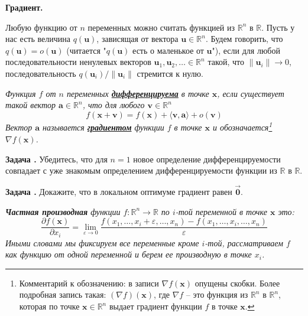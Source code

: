 \documentclass[12pt,a4paper]{article}
\def\R{\mathbb{R}}
\newcounter{znum}
\newcommand{\zz}[1]{\addtocounter{znum}{1} \textbf{Задача \arabic{znum}#1. }}
\begin{document}
\pagestyle{empty}

\begin{center} \Large \textbf{Градиент.}
\end{center}

Любую функцию от $n$ переменных можно считать функцией из $\R^n$ в $\R$. 
Пусть у нас есть величина $q(\mathbf{u})$, зависящая от вектора $\mathbf{u} \in \R^n$. Будем говорить, что $q(\mathbf{u}) = o(\mathbf{u})$ (читается "$q(\mathbf{u})$ есть о маленькое от $\mathbf{u}$"), если для любой последовательности ненулевых векторов $\mathbf{u}_1, \mathbf{u}_2, \ldots \in \R^n$ такой, что $\|\mathbf{u}_i\| \to 0$, последовательность $q(\mathbf{u}_i) / \| \mathbf{u}_i\|$ стремится к нулю.


{\it Функция $f$ от $n$ переменных \textbf{\href{https://ru.wikipedia.org/wiki/\%D0\%94\%D0\%B8\%D1\%84\%D1\%84\%D0\%B5\%D1\%80\%D0\%B5\%D0\%BD\%D1\%86\%D0\%B8\%D1\%80\%D1\%83\%D0\%B5\%D0\%BC\%D0\%B0\%D1\%8F_\%D1\%84\%D1\%83\%D0\%BD\%D0\%BA\%D1\%86\%D0\%B8\%D1\%8F\#\%D0\%A4\%D1\%83\%D0\%BD\%D0\%BA\%D1\%86\%D0\%B8\%D0\%B8_\%D0\%BD\%D0\%B5\%D1\%81\%D0\%BA\%D0\%BE\%D0\%BB\%D1\%8C\%D0\%BA\%D0\%B8\%D1\%85_\%D0\%BF\%D0\%B5\%D1\%80\%D0\%B5\%D0\%BC\%D0\%B5\%D0\%BD\%D0\%BD\%D1\%8B\%D1\%85}{дифференцируема}} в точке $\mathbf{x}$, если существует такой вектор $\mathbf{a} \in \R^n$, что для любого $\mathbf{v} \in \R^n$
$$ f(\mathbf{x} + \mathbf{v}) = f(\mathbf{x}) + \langle \mathbf{v}, \mathbf{a} \rangle + o(\mathbf{v})$$
Вектор $\mathbf{a}$ называется \textbf{\href{https://ru.wikipedia.org/wiki/\%D0\%93\%D1\%80\%D0\%B0\%D0\%B4\%D0\%B8\%D0\%B5\%D0\%BD\%D1\%82}{градиентом}} функции $f$ в точке $\mathbf{x}$ и обозначается\footnote{
	Комментарий к обозначению: в записи $\nabla f(\mathbf{x})$ опущены скобки. Более подробная запись такая: $(\nabla f)(\mathbf{x})$, где $\nabla f$ -- это функция из $\R^n$ в $\R^n$, которая по точке $\mathbf{x} \in \R^n$ выдает градиент функции $f$ в точке $\mathbf{x}$.
} $\nabla f(\mathbf{x})$.
}

\zz{} Убедитесь, что для $n=1$ новое определение дифференцируемости совпадает с уже знакомым определением дифференцируемости функции из $\R$ в $\R$.

\zz{} Докажите, что в локальном оптимуме градиент равен $\overrightarrow{\mathbf{0}}$.

{\it \textbf{Частная производная} функции $f : \R^n \to \R$ по $i$-той переменной в точке $\mathbf{x}$ это:
$$ \frac{\partial f(\mathbf{x})}{\partial x_i} = \lim_{\varepsilon \to 0} \frac{f(x_1, \ldots, x_i + \varepsilon,\ldots, x_n) - f(x_1, \ldots, x_i,\ldots, x_n)}{\varepsilon} $$
Иными словами мы фиксируем все переменные кроме $i$-той, рассматриваем $f$ как функцию от одной переменной и берем ее производную в точке $x_i$.
}
\end{document}
